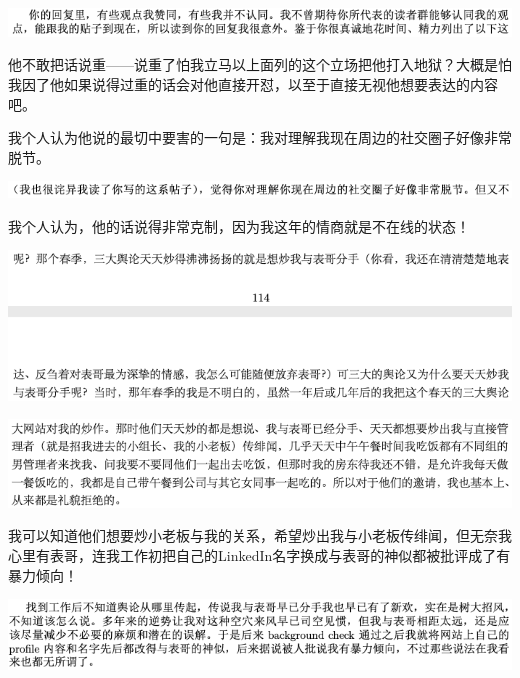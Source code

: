 \documentclass[9pt, b5paper]{article}
\begin{document}
\begin{center}
\includegraphics[width=.9\linewidth]{./pic/backups_plans_20210417_214759.png}
\end{center}

他不敢把话说重——说重了怕我立马以上面列的这个立场把他打入地狱？大概是怕我因了他如果说得过重的话会对他直接开怼，以至于直接无视他想要表达的内容吧。

我个人认为他说的最切中要害的一句是：我对理解我现在周边的社交圈子好像非常脱节。

\begin{center}
\includegraphics[width=.9\linewidth]{./pic/backups_plans_20210417_215109.png}
\end{center}

我个人认为，他的话说得非常克制，因为我这年的情商就是不在线的状态！

\begin{center}
\includegraphics[width=.9\linewidth]{./pic/backups_plans_20210417_215938.png}
\end{center}

\begin{center}
\includegraphics[width=.9\linewidth]{./pic/backups_plans_20210417_215959.png}
\end{center}

我可以知道他们想要炒小老板与我的关系，希望炒出我与小老板传绯闻，但无奈我心里有表哥，连我工作初把自己的LinkedIn名字换成与表哥的神似都被批评成了有暴力倾向！

\begin{center}
\includegraphics[width=.9\linewidth]{./pic/backups_plans_20210417_220548.png}
\end{center}
\end{document}
